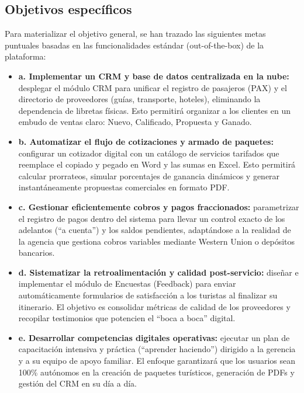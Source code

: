 \subsection{Objetivos específicos}
\begin{indentedsubsection}
Para materializar el objetivo general, se han trazado las siguientes metas puntuales basadas en las funcionalidades estándar (out-of-the-box) de la plataforma:

\begin{itemize}
    \item \textbf{a. Implementar un CRM y base de datos centralizada en la nube:} desplegar el módulo CRM para unificar el registro de pasajeros (PAX) y el directorio de proveedores (guías, transporte, hoteles), eliminando la dependencia de libretas físicas. Esto permitirá organizar a los clientes en un embudo de ventas claro: Nuevo, Calificado, Propuesta y Ganado.
    \item \textbf{b. Automatizar el flujo de cotizaciones y armado de paquetes:} configurar un cotizador digital con un catálogo de servicios tarifados que reemplace el copiado y pegado en Word y las sumas en Excel. Esto permitirá calcular prorrateos, simular porcentajes de ganancia dinámicos y generar instantáneamente propuestas comerciales en formato PDF.
    \item \textbf{c. Gestionar eficientemente cobros y pagos fraccionados:} parametrizar el registro de pagos dentro del sistema para llevar un control exacto de los adelantos (``a cuenta'') y los saldos pendientes, adaptándose a la realidad de la agencia que gestiona cobros variables mediante Western Union o depósitos bancarios.
    \item \textbf{d. Sistematizar la retroalimentación y calidad post-servicio:} diseñar e implementar el módulo de Encuestas (Feedback) para enviar automáticamente formularios de satisfacción a los turistas al finalizar su itinerario. El objetivo es consolidar métricas de calidad de los proveedores y recopilar testimonios que potencien el ``boca a boca'' digital.
    \item \textbf{e. Desarrollar competencias digitales operativas:} ejecutar un plan de capacitación intensiva y práctica (``aprender haciendo'') dirigido a la gerencia y a su equipo de apoyo familiar. El enfoque garantizará que los usuarios sean 100\% autónomos en la creación de paquetes turísticos, generación de PDFs y gestión del CRM en su día a día.
\end{itemize}
\end{indentedsubsection}

